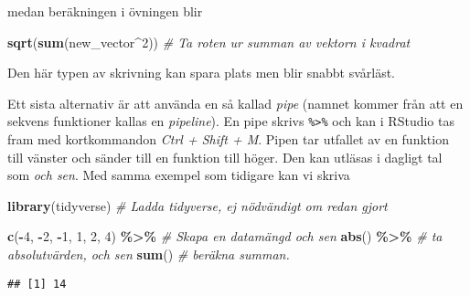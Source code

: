 \documentclass[
]{book}
\newenvironment{Shaded}{\begin{snugshade}}{\end{snugshade}}
\newcommand{\CommentTok}[1]{\textcolor[rgb]{0.56,0.35,0.01}{\textit{#1}}}
\newcommand{\DecValTok}[1]{\textcolor[rgb]{0.00,0.00,0.81}{#1}}
\newcommand{\FunctionTok}[1]{\textcolor[rgb]{0.13,0.29,0.53}{\textbf{#1}}}
\newcommand{\NormalTok}[1]{#1}
\newcommand{\SpecialCharTok}[1]{\textcolor[rgb]{0.81,0.36,0.00}{\textbf{#1}}}
\theoremstyle{definition}
\theoremstyle{definition}
\theoremstyle{definition}
\theoremstyle{definition}
\theoremstyle{remark}
\begin{document}
medan beräkningen i övningen blir

\begin{Shaded}
\begin{Highlighting}[]
\FunctionTok{sqrt}\NormalTok{(}\FunctionTok{sum}\NormalTok{(new\_vector}\SpecialCharTok{\^{}}\DecValTok{2}\NormalTok{))                }\CommentTok{\# Ta roten ur summan av vektorn i kvadrat}
\end{Highlighting}
\end{Shaded}

Den här typen av skrivning kan spara plats men blir snabbt svårläst.

Ett sista alternativ är att använda en så kallad \emph{pipe} (namnet kommer från att en sekvens funktioner kallas en \emph{pipeline}). En pipe skrivs \texttt{\%\textgreater{}\%} och kan i RStudio tas fram med kortkommandon \emph{Ctrl + Shift + M}. Pipen tar utfallet av en funktion till vänster och sänder till en funktion till höger. Den kan utläsas i dagligt tal som \emph{och sen}. Med samma exempel som tidigare kan vi skriva

\begin{Shaded}
\begin{Highlighting}[]
\FunctionTok{library}\NormalTok{(tidyverse)                     }\CommentTok{\# Ladda tidyverse, ej nödvändigt om redan gjort}

\FunctionTok{c}\NormalTok{(}\SpecialCharTok{{-}}\DecValTok{4}\NormalTok{, }\SpecialCharTok{{-}}\DecValTok{2}\NormalTok{, }\SpecialCharTok{{-}}\DecValTok{1}\NormalTok{, }\DecValTok{1}\NormalTok{, }\DecValTok{2}\NormalTok{, }\DecValTok{4}\NormalTok{) }\SpecialCharTok{\%\textgreater{}\%}             \CommentTok{\# Skapa en datamängd och sen}
  \FunctionTok{abs}\NormalTok{() }\SpecialCharTok{\%\textgreater{}\%}                            \CommentTok{\# ta absolutvärden, och sen}
  \FunctionTok{sum}\NormalTok{()                                }\CommentTok{\# beräkna summan.}
\end{Highlighting}
\end{Shaded}

\begin{verbatim}
## [1] 14
\end{verbatim}
\end{document}
